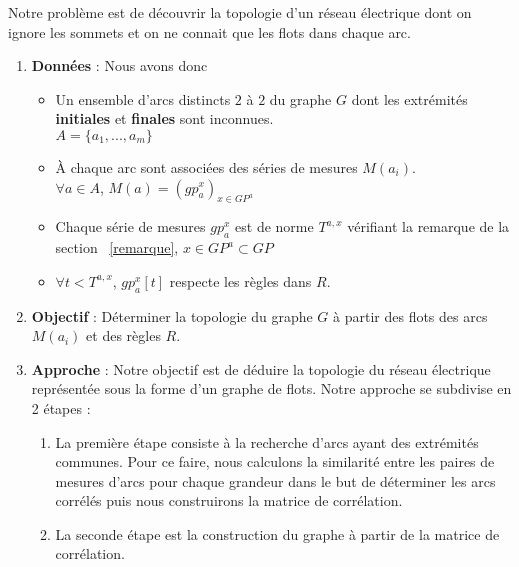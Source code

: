 Notre probl\`eme est de d\'ecouvrir la topologie d'un r\'eseau \'electrique dont on ignore les sommets et on ne connait que les flots dans chaque arc.
\begin{enumerate}
\item {\bf Donn\'ees} : 
\newline
Nous  avons donc
\begin{itemize}
	\item Un ensemble d'arcs distincts $2$ \`a $2$ du graphe $G$ dont les extr\'emit\'es \textbf{initiales} et \textbf{finales} sont inconnues.\\ $ A =\{ a_{1}, ... , a_{m} \} $ 
		
	\item \`A chaque arc sont associ\'ees des s\'eries de mesures $M(a_{i})$. \\
		$\forall a \in A$, $M(a) = ( gp_{a}^{x})_{x\in GP^{a}}$
		
	\item Chaque s\'erie de mesures $ gp_{a}^{x}$ est de norme $T^{a, x}$ v\'erifiant la remarque de la section ~\ref{remarque},  $x \in GP^{a} \subset GP$
	
	\item $\forall t < T^{a, x}$, $  gp_{a}^{x}[t] $ respecte les r\`egles dans $R$.
\end{itemize}
\item {\bf Objectif} : 
\newline
D\'eterminer la topologie  du graphe $G$ \`a partir des flots des arcs $M(a_{i})$ et des r\`egles $R$.

\item {\bf Approche} :
\newline
Notre objectif est de d\'eduire la topologie du r\'eseau \'electrique repr\'esent\'ee sous la forme d'un graphe de flots. Notre approche se subdivise en 2 \'etapes :
\begin{enumerate}
	\item La premi\`ere \'etape consiste \`a la recherche d'arcs ayant des extr\'emit\'es communes. Pour ce faire, nous calculons la similarit\'e entre les paires de mesures d'arcs pour chaque grandeur dans le but  de d\'eterminer les arcs corr\'el\'es puis nous construirons la matrice de corr\'elation. 
	\item La seconde \'etape est la construction du graphe \`a partir de la matrice de corr\'elation. 
\end{enumerate}


\end{enumerate}